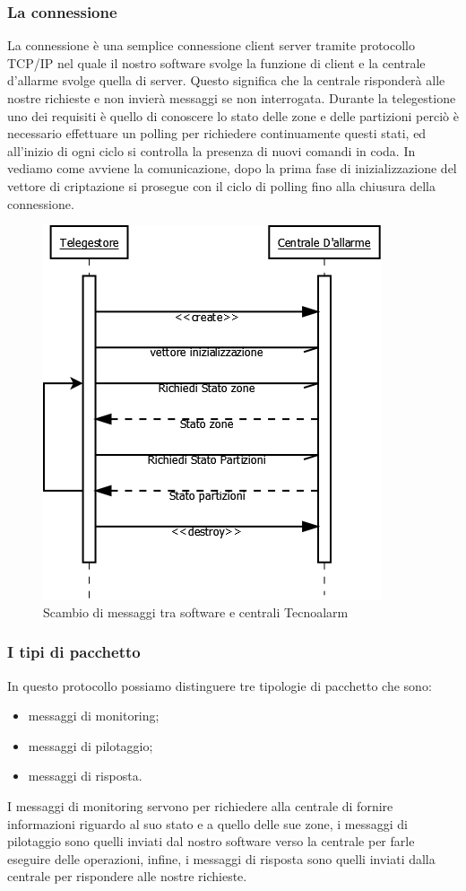 \subsubsection{La connessione}
La connessione è una semplice connessione client server tramite protocollo TCP/IP nel quale il nostro software svolge la funzione di client e la centrale d'allarme svolge quella di server. Questo significa che la centrale risponderà alle nostre richieste e non invierà messaggi se non interrogata. Durante la telegestione uno dei requisiti è quello di conoscere lo stato delle zone e delle partizioni perciò è necessario effettuare un polling per richiedere continuamente questi stati, ed all'inizio di ogni ciclo si controlla la presenza di nuovi comandi in coda.
In  vediamo come avviene la comunicazione, dopo la prima fase di inizializzazione del vettore di criptazione si prosegue con il ciclo di polling fino alla chiusura della connessione.
\begin{figure}
\centering
\includegraphics[width=0.7\linewidth]{pictures/contecno.png}
\caption{Scambio di messaggi tra software e centrali Tecnoalarm}\label{fig:contecno}	
\end{figure}
\subsubsection{I tipi di pacchetto}
In questo protocollo possiamo distinguere tre tipologie di pacchetto che sono:
\begin{itemize}
	\item messaggi di monitoring;
	\item messaggi di pilotaggio;
	\item messaggi di risposta.
\end{itemize}
I messaggi di monitoring servono per richiedere alla centrale di fornire informazioni riguardo al suo stato e a quello delle sue zone, i messaggi di pilotaggio sono quelli inviati dal nostro software verso la centrale per farle eseguire delle operazioni, infine, i messaggi di risposta sono quelli inviati dalla centrale per rispondere alle nostre richieste.
